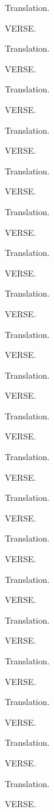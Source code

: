 \bvb Translation.\evb
\evg


\bvg
\bva VERSE.\eva

\bvb Translation.\evb
\evg


\bvg
\bva VERSE.\eva

\bvb Translation.\evb
\evg


\bvg
\bva VERSE.\eva

\bvb Translation.\evb
\evg


\bvg
\bva VERSE.\eva

\bvb Translation.\evb
\evg


\bvg
\bva VERSE.\eva

\bvb Translation.\evb
\evg


\bvg
\bva VERSE.\eva

\bvb Translation.\evb
\evg


\bvg
\bva VERSE.\eva

\bvb Translation.\evb
\evg


\bvg
\bva VERSE.\eva

\bvb Translation.\evb
\evg


\bvg
\bva VERSE.\eva

\bvb Translation.\evb
\evg


\bvg
\bva VERSE.\eva

\bvb Translation.\evb
\evg


\bvg
\bva VERSE.\eva

\bvb Translation.\evb
\evg


\bvg
\bva VERSE.\eva

\bvb Translation.\evb
\evg


\bvg
\bva VERSE.\eva

\bvb Translation.\evb
\evg


\bvg
\bva VERSE.\eva

\bvb Translation.\evb
\evg


\bvg
\bva VERSE.\eva

\bvb Translation.\evb
\evg


\bvg
\bva VERSE.\eva

\bvb Translation.\evb
\evg


\bvg
\bva VERSE.\eva

\bvb Translation.\evb
\evg


\bvg
\bva VERSE.\eva

\bvb Translation.\evb
\evg


\bvg
\bva VERSE.\eva

\bvb Translation.\evb
\evg


\bvg
\bva VERSE.\eva

